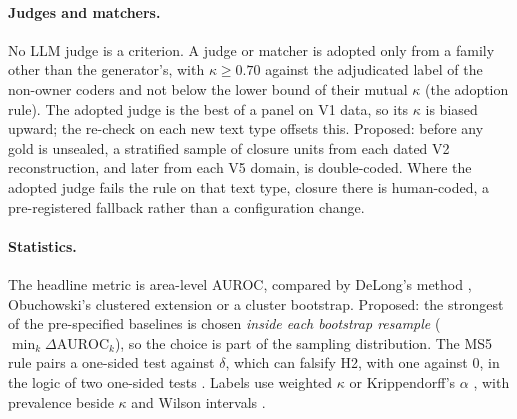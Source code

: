 \paragraph{Judges and matchers.} No LLM judge is a criterion. A judge or matcher is adopted only
from a family other than the generator's, with $\kappa \geq 0.70$ against the adjudicated label of
the non-owner coders and not below the lower bound of their mutual $\kappa$ (the adoption rule). The
adopted judge is the best of a panel on V1 data, so its $\kappa$ is biased upward; the re-check on each
new text type offsets this. \evfut{} Proposed: before
any gold is unsealed, a stratified sample of closure units from each dated V2 reconstruction, and
later from each V5 domain, is double-coded. Where the adopted judge fails the rule on that text
type, closure there is human-coded, a pre-registered fallback rather than a configuration change.

\paragraph{Statistics.} The headline metric is area-level AUROC, compared by DeLong's method
\parencite{delong1988comparing}, Obuchowski's clustered extension
\parencite{obuchowski1997nonparametric} or a cluster bootstrap. \evfut{} Proposed: the strongest of
the pre-specified baselines is chosen \emph{inside each bootstrap resample}
($\min_k \Delta\mathrm{AUROC}_k$), so the choice is part of the sampling distribution. The MS5 rule
pairs a one-sided test against $\delta$, which can falsify H2, with one against 0, in the logic of two
one-sided tests
\parencite{schuirmann1987comparison,lakens2017equivalence,lakens2018equivalence}. Labels use
weighted $\kappa$ or Krippendorff's $\alpha$ \parencite{hayes2007answering,krippendorff2004reliability},
with prevalence beside $\kappa$ \parencite{feinstein1990high} and Wilson intervals
\parencite{wilson1927probable}.

